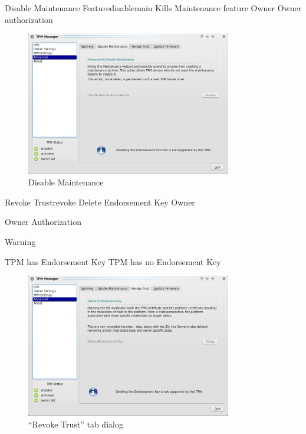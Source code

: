 \documentclass[
  american        %
]{sirrixreport}
\begin{document}
\begin{usecase}{Disable Maintenance Feature}{disablemain}
\ucdesc Kills Maintenance feature
\ucactors Owner
\ucinclude Owner authorization
\end{usecase}

\begin{figure}[h]
 \centering
 \includegraphics[width=0.8\textwidth]{images/uc_disable_maint.jpg}
 \caption{Disable Maintenance }
\end{figure}
\clearpage

\begin{usecase}{Revoke Trust}{revoke}
\ucdesc Delete Endorsement Key
\ucactors  Owner
\ucinclude 
   \begin{compactitem}
      \item Owner Authorization 
      \item Warning 
   \end{compactitem}
\ucprecond TPM has Endorsement Key
\ucpostcond TPM has no Endorsement Key
\end{usecase}

\begin{figure}[h]
 \centering
 \includegraphics[width=0.8\textwidth]{images/uc_revoketrust.jpg}
 \caption{``Revoke Trust'' tab dialog }
\end{figure}
\clearpage
\end{document}
